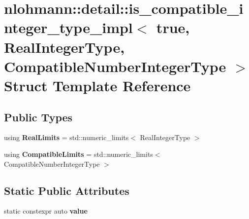 \hypertarget{structnlohmann_1_1detail_1_1is__compatible__integer__type__impl_3_01true_00_01_real_integer_type78b0ba77f36a8c8169cdb79b01d1a4bf}{}\section{nlohmann\+:\+:detail\+:\+:is\+\_\+compatible\+\_\+integer\+\_\+type\+\_\+impl$<$ true, Real\+Integer\+Type, Compatible\+Number\+Integer\+Type $>$ Struct Template Reference}
\label{structnlohmann_1_1detail_1_1is__compatible__integer__type__impl_3_01true_00_01_real_integer_type78b0ba77f36a8c8169cdb79b01d1a4bf}
\subsection*{Public Types}
\begin{DoxyCompactItemize}
\item 
\mbox{\label{structnlohmann_1_1detail_1_1is__compatible__integer__type__impl_3_01true_00_01_real_integer_type78b0ba77f36a8c8169cdb79b01d1a4bf_a1bad172320cd124997a3d68990f50a75}} 
using {\bfseries Real\+Limits} = std\+::numeric\+\_\+limits$<$ Real\+Integer\+Type $>$
\item 
\mbox{\label{structnlohmann_1_1detail_1_1is__compatible__integer__type__impl_3_01true_00_01_real_integer_type78b0ba77f36a8c8169cdb79b01d1a4bf_a3bf8ee2f76e74f997258c9ba40c64bc4}} 
using {\bfseries Compatible\+Limits} = std\+::numeric\+\_\+limits$<$ Compatible\+Number\+Integer\+Type $>$
\end{DoxyCompactItemize}
\subsection*{Static Public Attributes}
\begin{DoxyCompactItemize}
\item 
static constexpr auto {\bfseries value}
\end{DoxyCompactItemize}


